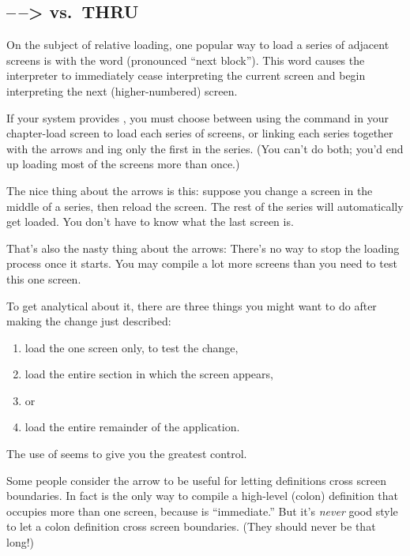 \subsection{--\,--> vs.\ THRU}

On the subject of relative loading, one popular way to load a series
of adjacent screens is with the word \forth{-{}->} (pronounced ``next
block'').  This word causes the interpreter to immediately cease
interpreting the current screen and begin interpreting the next
(higher-numbered) screen.

If your system provides \forth{-{}->}, you must choose between using
the  command in your chapter-load screen to load each
series of screens, or linking each series together with the arrows and
ing only the first in the series.  (You can't do both;
you'd end up loading most of the screens more than once.)

The nice thing about the arrows is this: suppose you change a screen
in the middle of a series, then reload the screen.  The rest of the
series will automatically get loaded.  You don't have to know what the
last screen is.

That's also the nasty thing about the arrows: There's no way to stop
the loading process once it starts.  You may compile a lot more
screens than you need to test this one screen.

To get analytical about it, there are three things you might want to
do after making the change just described:

\begin{enumerate}\parsep=0pt\itemsep=0pt
\item load the one screen only, to test the change,
\item load the entire section in which the screen appears,
\item[] or
\item load the entire remainder of the application.
\end{enumerate}
The use of  seems to give you the greatest control.

Some people consider the arrow to be useful for letting definitions
cross screen boundaries.  In fact \forth{-{}->} is the only way to
compile a high-level (colon) definition that occupies more than one
screen, because \forth{-{}->} is ``immediate.'' But it's \emph{never}
good style to let a colon definition cross screen boundaries.  (They
should never be that long!)


